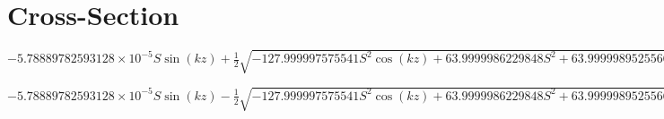 \documentclass[12pt]{article}
\begin{document}
\section{Cross-Section}

$- 5.78889782593128 \times 10^{-5} S \operatorname{sin}\left(kz\right) + \frac{1}{2} \sqrt{- 127.999997575541 S^{2} \operatorname{cos}\left(kz\right) + 63.9999986229848 S^{2} + 63.9999989525566 S^{2} \operatorname{cos}^{2}\left(kz\right)}$

$- 5.78889782593128 \times 10^{-5} S \operatorname{sin}\left(kz\right) - \frac{1}{2} \sqrt{- 127.999997575541 S^{2} \operatorname{cos}\left(kz\right) + 63.9999986229848 S^{2} + 63.9999989525566 S^{2} \operatorname{cos}^{2}\left(kz\right)}$
\end{document}

